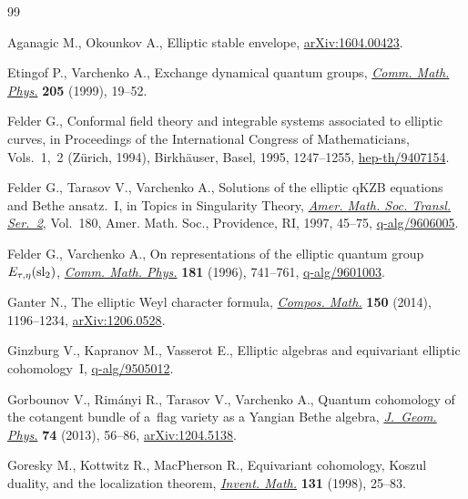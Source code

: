 \documentclass[pdftex]{sigma}
\numberwithin{equation}{section}
\begin{document}
\begin{thebibliography}{99}
\footnotesize\itemsep=0.5pt

Aganagic M., Okounkov A., Elliptic stable envelope, \href{https://arxiv.org/abs/1604.00423}{arXiv:1604.00423}.

Etingof P., Varchenko A., Exchange dynamical quantum groups, \href{https://doi.org/10.1007/s002200050665}{\textit{Comm.
 Math. Phys.}} \textbf{205} (1999), 19--52.

Felder G., Conformal field theory and integrable systems associated to elliptic
 curves, in Proceedings of the {I}nternational {C}ongress of {M}athematicians,
 {V}ols.~1,~2 ({Z}\"{u}rich, 1994), Birkh\"{a}user, Basel, 1995, 1247--1255,
 \href{https://arxiv.org/abs/hep-th/9407154}{hep-th/9407154}.

Felder G., Tarasov V., Varchenko A., Solutions of the elliptic q{KZB} equations
 and {B}ethe ansatz.~{I}, in Topics in Singularity Theory, \href{https://doi.org/10.1090/trans2/180/04}{\textit{Amer. Math.
 Soc. Transl. Ser.~2}}, Vol.~180, Amer. Math. Soc., Providence, RI, 1997,
 45--75, \href{https://arxiv.org/abs/q-alg/9606005}{q-alg/9606005}.

Felder G., Varchenko A., On representations of the elliptic quantum group
 {$E_{\tau,\eta}({\rm sl}_2)$}, \href{https://doi.org/10.1007/BF02101296}{\textit{Comm. Math. Phys.}} \textbf{181}
 (1996), 741--761, \href{https://arxiv.org/abs/q-alg/9601003}{q-alg/9601003}.

Ganter N., The elliptic {W}eyl character formula, \href{https://doi.org/10.1112/S0010437X1300777X}{\textit{Compos. Math.}}
 \textbf{150} (2014), 1196--1234, \href{https://arxiv.org/abs/1206.0528}{arXiv:1206.0528}.

Ginzburg V., Kapranov M., Vasserot E., Elliptic algebras and equivariant
 elliptic cohomology~{I}, \mbox{\href{https://arxiv.org/abs/q-alg/9505012}{q-alg/9505012}}.

Gorbounov V., Rim\'{a}nyi R., Tarasov V., Varchenko A., Quantum cohomology of
 the cotangent bundle of a~flag variety as a {Y}angian {B}ethe algebra,
 \href{https://doi.org/10.1016/j.geomphys.2013.07.006}{\textit{J.~Geom. Phys.}} \textbf{74} (2013), 56--86, \href{https://arxiv.org/abs/1204.5138}{arXiv:1204.5138}.

Goresky M., Kottwitz R., MacPherson R., Equivariant cohomology, {K}oszul
 duality, and the localization theorem, \href{https://doi.org/10.1007/s002220050197}{\textit{Invent. Math.}} \textbf{131}
 (1998), 25--83.


\end{thebibliography}
\end{document}

